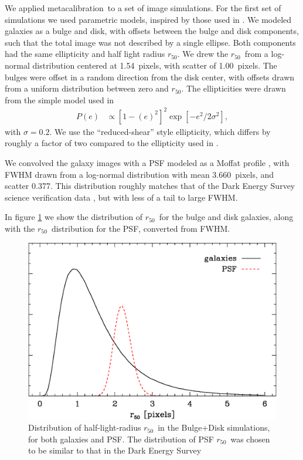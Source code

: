 \documentclass[usegraphicx,usenatbib]{mn2e}
\newcommand{\hlr}{$r_{50}$}
\newcommand{\hlrmean}{1.54}
\newcommand{\hlrwidth}{1.00}
\newcommand{\psffwhmmean}{3.660}
\newcommand{\psffwhmwidth}{0.377}
\newcommand{\mcal}{metacalibration}
\begin{document}
We applied \mcal\ to a set of image simulations.  For the first set of
simulations we used parametric models, inspired by those used in
\citet{bfd2015}.  We modeled galaxies as a bulge and disk, with offsets between the
bulge and disk components, such that the total image was not described by a
single ellipse.  Both components had the same ellipticity and half light radius
\hlr. We drew the \hlr\ from a log-normal distribution centered at \hlrmean\
pixels, with scatter of \hlrwidth\ pixels.  The bulges were offset in a random
direction from the disk center, with offsets drawn from a uniform distribution
between zero and \hlr.  The ellipticities were drawn from the simple model
used in \cite{ba14}
\begin{align}
    P(e) &\propto \left[1-(e)^2\right]^2 \exp\left[-e^2/2\sigma^2\right],
\end{align}
with $\sigma=0.2$.  We use the ``reduced-shear'' style ellipticity,
which differs by roughly a factor of two compared to the ellipticity used
in \citet{bfd2015}.

We convolved the galaxy images with a PSF modeled as a Moffat profile
\citep{Moffat1969}, with FWHM drawn from a log-normal distribution with mean
\psffwhmmean\ pixels, and scatter \psffwhmwidth. This distribution roughly
matches that of the Dark Energy Survey science verification data
\citep[][(DES)]{DESSVShear}, but with less of a tail to large FWHM.

In figure \ref{fig:psimhlrcompare} we show the distribution of \hlr\ for the
bulge and disk galaxies, along with the \hlr\ distribution for the PSF,
converted from FWHM.

\begin{figure}
    \centering
    \includegraphics[scale=0.45]{sim-bd29-r50.eps}

    \caption{Distribution of half-light-radius \hlr\ in the Bulge+Disk simulations,
        for both galaxies and PSF.  The distribution of PSF \hlr\ 
        was chosen to be similar to that in the 
        Dark Energy Survey}

\label{fig:psimhlrcompare}
\end{figure}
\end{document}
